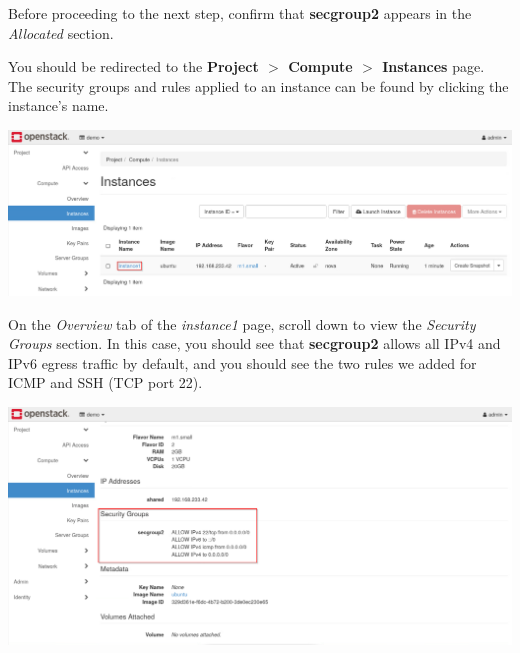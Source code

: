 \documentclass[letterpaper, 12pt]{article}
\begin{document}
\begin{enumerate}
    \begin{stopbox}
        Before proceeding to the next step, confirm that \textbf{secgroup2} appears in the \textit{Allocated} section.
    \end{stopbox}

    \begin{labstep}
        You should be redirected to the \textbf{Project $>$ Compute $>$ Instances} page.
        The security groups and rules applied to an instance can be found by clicking the instance's name.

        \begin{center}
            \includegraphics[width=\linewidth]{images/part2/step16.png}
        \end{center}
    \end{labstep}

    \begin{labstep}
        On the \textit{Overview} tab of the \textit{instance1} page, scroll down to view the \textit{Security Groups} section.
        In this case, you should see that \textbf{secgroup2} allows all IPv4 and IPv6 egress traffic by default, and you should see the two rules we added for ICMP and SSH (TCP port 22).

        \begin{center}
            \includegraphics[width=\linewidth]{images/part2/step17.png}
        \end{center}
    \end{labstep}


\end{enumerate}
\end{document}
